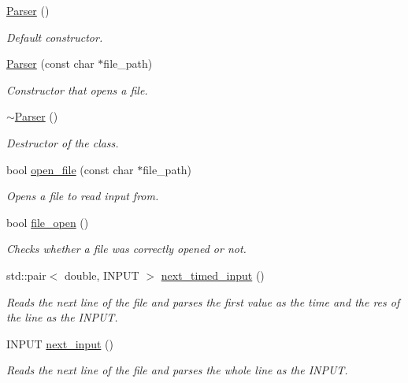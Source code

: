 \begin{DoxyCompactItemize}
\item 
\hyperlink{classParser_a0d63531cd89ae4d7ce378034d4ab60ca}{Parser} ()
\begin{DoxyCompactList}\small\item\em Default constructor. \end{DoxyCompactList}\item 
\hyperlink{classParser_a4bbe998721c17d2dcb114f61cb4eeab5}{Parser} (const char $\ast$file\+\_\+path)
\begin{DoxyCompactList}\small\item\em Constructor that opens a file. \end{DoxyCompactList}\item 
\hyperlink{classParser_a41b13636c64430a962617bb508249663}{$\sim$\+Parser} ()
\begin{DoxyCompactList}\small\item\em Destructor of the class. \end{DoxyCompactList}\item 
bool \hyperlink{classParser_a0d45645eefd19e2872e7c9a9b9134017}{open\+\_\+file} (const char $\ast$file\+\_\+path)
\begin{DoxyCompactList}\small\item\em Opens a file to read input from. \end{DoxyCompactList}\item 
bool \hyperlink{classParser_aef3ae8c9c1b087574fa78376435df690}{file\+\_\+open} ()
\begin{DoxyCompactList}\small\item\em Checks whether a file was correctly opened or not. \end{DoxyCompactList}\item 
std\+::pair$<$ double, I\+N\+P\+UT $>$ \hyperlink{classParser_af5a8a76005b69198563da309a7a169e3}{next\+\_\+timed\+\_\+input} ()
\begin{DoxyCompactList}\small\item\em Reads the next line of the file and parses the first value as the time and the res of the line as the I\+N\+P\+UT. \end{DoxyCompactList}\item 
I\+N\+P\+UT \hyperlink{classParser_a08d758d3b93b3854ac21dc3e81c27345}{next\+\_\+input} ()
\begin{DoxyCompactList}\small\item\em Reads the next line of the file and parses the whole line as the I\+N\+P\+UT. \end{DoxyCompactList}\end{DoxyCompactItemize}


